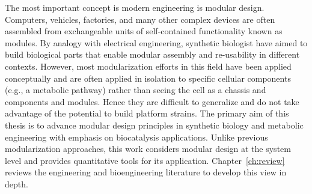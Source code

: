 The most important concept is modern engineering is modular design. Computers, vehicles, factories, and many other complex devices are often assembled from exchangeable units of self-contained functionality known as modules.
By analogy with electrical engineering, synthetic biologist have aimed to build biological parts that enable modular assembly and re-usability in different contexts.
However, most modularization efforts in this field have been applied conceptually and are often applied in isolation to specific cellular components (e.g., a metabolic pathway) rather than seeing the cell as a chassis and components and modules. Hence they are difficult to generalize and do not take advantage of the potential to build platform strains.
The primary aim of this thesis is to advance modular design principles in synthetic biology and metabolic engineering with emphasis on biocatalysis applications.
Unlike previous modularization approaches, this work considers modular design at the system level and provides quantitative tools for its application.
Chapter~\ref{ch:review} reviews the engineering and bioengineering literature to develop this view in depth.






